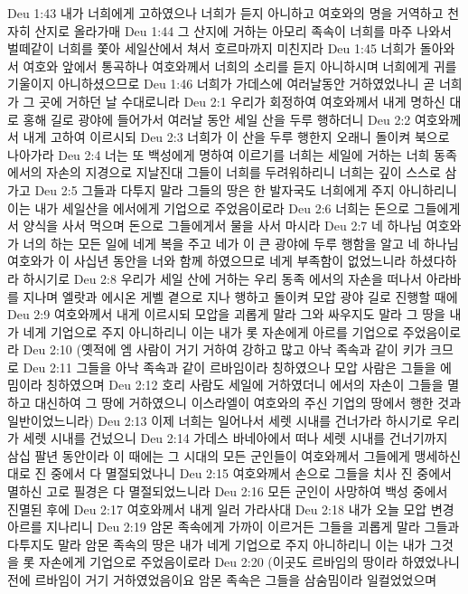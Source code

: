 Deu 1:43  내가 너희에게 고하였으나 너희가 듣지 아니하고 여호와의 명을 거역하고 천자히 산지로 올라가매
Deu 1:44  그 산지에 거하는 아모리 족속이 너희를 마주 나와서 벌떼같이 너희를 쫓아 세일산에서 쳐서 호르마까지 미친지라
Deu 1:45  너희가 돌아와서 여호와 앞에서 통곡하나 여호와께서 너희의 소리를 듣지 아니하시며 너희에게 귀를 기울이지 아니하셨으므로
Deu 1:46  너희가 가데스에 여러날동안 거하였었나니 곧 너희가 그 곳에 거하던 날 수대로니라
Deu 2:1  우리가 회정하여 여호와께서 내게 명하신 대로 홍해 길로 광야에 들어가서 여러날 동안 세일 산을 두루 행하더니
Deu 2:2  여호와께서 내게 고하여 이르시되
Deu 2:3  너희가 이 산을 두루 행한지 오래니 돌이켜 북으로 나아가라
Deu 2:4  너는 또 백성에게 명하여 이르기를 너희는 세일에 거하는 너희 동족 에서의 자손의 지경으로 지날진대 그들이 너희를 두려워하리니 너희는 깊이 스스로 삼가고
Deu 2:5  그들과 다투지 말라 그들의 땅은 한 발자국도 너희에게 주지 아니하리니 이는 내가 세일산을 에서에게 기업으로 주었음이로라
Deu 2:6  너희는 돈으로 그들에게서 양식을 사서 먹으며 돈으로 그들에게서 물을 사서 마시라
Deu 2:7  네 하나님 여호와가 너의 하는 모든 일에 네게 복을 주고 네가 이 큰 광야에 두루 행함을 알고 네 하나님 여호와가 이 사십년 동안을 너와 함께 하였으므로 네게 부족함이 없었느니라 하셨다하라 하시기로
Deu 2:8  우리가 세일 산에 거하는 우리 동족 에서의 자손을 떠나서 아라바를 지나며 엘랏과 에시온 게벨 곁으로 지나 행하고 돌이켜 모압 광야 길로 진행할 때에
Deu 2:9  여호와께서 내게 이르시되 모압을 괴롭게 말라 그와 싸우지도 말라 그 땅을 내가 네게 기업으로 주지 아니하리니 이는 내가 롯 자손에게 아르를 기업으로 주었음이로라
Deu 2:10  (옛적에 엠 사람이 거기 거하여 강하고 많고 아낙 족속과 같이 키가 크므로
Deu 2:11  그들을 아낙 족속과 같이 르바임이라 칭하였으나 모압 사람은 그들을 에밈이라 칭하였으며
Deu 2:12  호리 사람도 세일에 거하였더니 에서의 자손이 그들을 멸하고 대신하여 그 땅에 거하였으니 이스라엘이 여호와의 주신 기업의 땅에서 행한 것과 일반이었느니라)
Deu 2:13  이제 너희는 일어나서 세렛 시내를 건너가라 하시기로 우리가 세렛 시내를 건넜으니
Deu 2:14  가데스 바네아에서 떠나 세렛 시내를 건너기까지 삼십 팔년 동안이라 이 때에는 그 시대의 모든 군인들이 여호와께서 그들에게 맹세하신대로 진 중에서 다 멸절되었나니
Deu 2:15  여호와께서 손으로 그들을 치사 진 중에서 멸하신 고로 필경은 다 멸절되었느니라
Deu 2:16  모든 군인이 사망하여 백성 중에서 진멸된 후에
Deu 2:17  여호와께서 내게 일러 가라사대
Deu 2:18  내가 오늘 모압 변경 아르를 지나리니
Deu 2:19  암몬 족속에게 가까이 이르거든 그들을 괴롭게 말라 그들과 다투지도 말라 암몬 족속의 땅은 내가 네게 기업으로 주지 아니하리니 이는 내가 그것을 롯 자손에게 기업으로 주었음이로라
Deu 2:20  (이곳도 르바임의 땅이라 하였었나니 전에 르바임이 거기 거하였었음이요 암몬 족속은 그들을 삼숨밈이라 일컬었었으며
